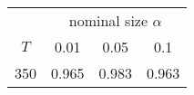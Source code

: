 % 
\begin{tabular}{cccc}
  \hline
  & \multicolumn{3}{c}{nominal size $\alpha$} \\
 $T$ & 0.01 & 0.05 & 0.1 \\
 \hline
350 & 0.965 & 0.983 & 0.963 \\ 
   \hline
\end{tabular}
